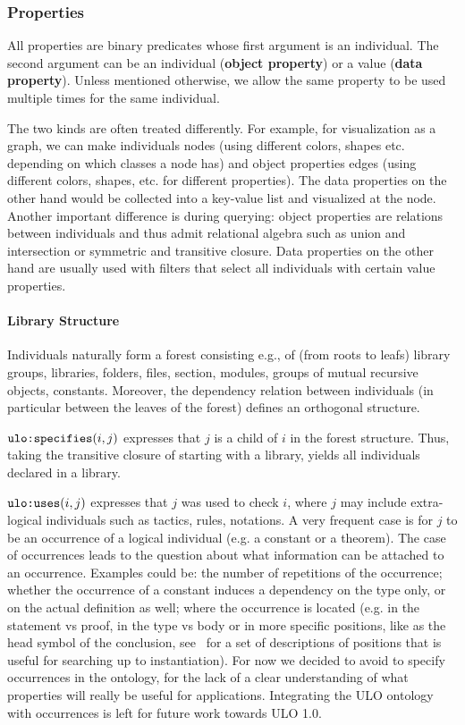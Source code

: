 \subsubsection{Properties}\label{sec:objprops}

All properties are binary predicates whose first argument is an individual.
The second argument can be an individual (\textbf{object property}) or a value (\textbf{data property}).
Unless mentioned otherwise, we allow the same property to be used multiple times for the same individual.

The two kinds are often treated differently.
For example, for visualization as a graph, we can make individuals nodes (using different colors, shapes etc. depending on which classes a node has) and object properties edges (using different colors, shapes, etc. for different properties).
The data properties on the other hand would be collected into a key-value list and visualized at the node.
Another important difference is during querying: object properties are relations between individuals and thus admit relational algebra such as union and intersection or symmetric and transitive closure.
Data properties on the other hand are usually used with filters that select all individuals with certain value properties.

\paragraph{Library Structure}
Individuals naturally form a forest consisting e.g., of (from roots to leafs) library groups, libraries, folders, files, section, modules, groups of mutual recursive objects, constants.
Moreover, the dependency relation between individuals (in particular between the leaves of the forest) defines an orthogonal structure.

$\ind{specifies}(i,j)${\isabelle\coq} expresses that $j$ is a child of $i$ in the forest structure.
Thus, taking the transitive closure of  starting with a library, yields all individuals declared in a library.

$\ind{uses}(i,j)${\isabelle\coq} expresses that $j$ was used to check $i$, where $j$ may include extra-logical individuals such as tactics, rules, notations.
A very frequent case is for $j$ to be an occurrence of a logical individual (e.g. a constant or a theorem). The case of occurrences leads to the question about what information can be attached to an occurrence. Examples could be: the number of repetitions of the occurrence; whether the occurrence of a constant induces a dependency on the type only, or on the actual definition as well; where the occurrence is located (e.g. in the statement vs proof, in the type vs body or in more specific positions, like as the head symbol of the conclusion, see~\cite{AGSTZ:ContMathSearchWhelp04} for a set of descriptions of positions that is useful for searching up to instantiation). For now we decided to avoid to specify occurrences in the ontology, for the lack of a clear understanding of what properties will really be useful for applications. Integrating the ULO ontology with occurrences is left for future work towards ULO 1.0.

